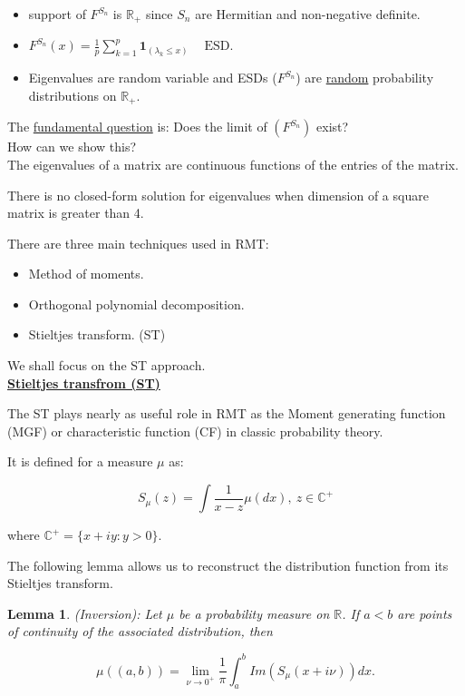\documentclass[twoside]{article}
\newtheorem{lemma}[theorem]{Lemma}
\begin{document}
\begin{itemize}
	\item support of $F^{S_n}$ is $\mathbb{R}_+$ since $S_n$ are Hermitian and non-negative definite.	
	\item $F^{S_n}(x)=\frac{1}{p}\sum^p_{k=1}\mathbf{1}_{(\lambda_k\leq x)}\ \ \ \ \text{ ESD}.$
	\item Eigenvalues are random variable and ESDs ($F^{S_n}$) are \underline{random} probability distributions on $\mathbb{R}_+$.
\end{itemize}

The \underline{fundamental question} is: Does the limit of $(F^{S_n})$ exist?\\

How can we show this?\\

The eigenvalues of a matrix are continuous functions of the entries of the matrix.

There is no closed-form solution for eigenvalues when dimension of a square matrix is greater than 4.

There are three main techniques used in RMT:

\begin{itemize}
	\item Method of moments.
	\item Orthogonal polynomial decomposition.
	\item Stieltjes transform. (ST)
\end{itemize}

We shall focus on the ST approach.\\

\underline{\textbf{Stieltjes transfrom (ST)}}

The ST plays nearly as useful role in RMT as the Moment generating function (MGF) or characteristic function (CF) in classic probability theory.

It is defined for a measure $\mu$ as:

$$S_\mu(z)=\int\frac{1}{x-z}\mu(dx),\ z\in\mathbb{C}^+$$

where $\mathbb{C}^+=\{x+iy: y>0\}.$

The following lemma allows us to reconstruct the distribution function from its Stieltjes transform.\\

\begin{lemma}
	(Inversion): Let $\mu$ be a probability measure on $\mathbb{R}$. If $a<b$ are points of continuity of the associated distribution, then
	
	$$\mu((a,b))=\lim_{\nu\rightarrow 0^+}\frac{1}{\pi}\int^b_a Im(S_\mu(x+i\nu))dx.$$
\end{lemma}
\end{document}
